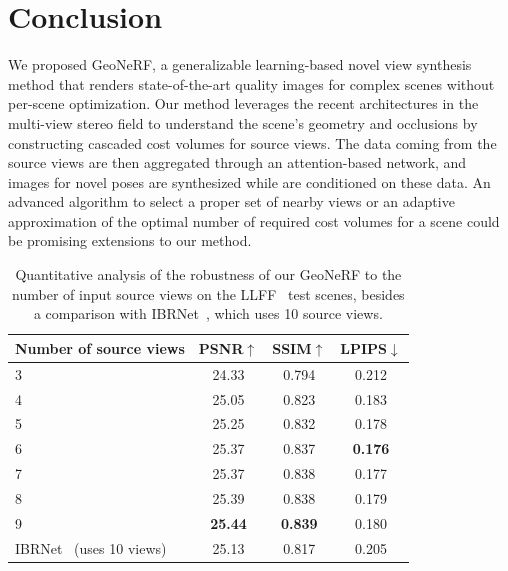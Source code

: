 \section{Conclusion}
We proposed GeoNeRF, a generalizable learning-based novel view synthesis method that renders state-of-the-art quality images for complex scenes without per-scene optimization. Our method leverages the recent architectures in the multi-view stereo field to understand the scene's geometry and occlusions by constructing cascaded cost volumes for source views. The data coming from the source views are then aggregated through an attention-based network, and images for novel poses are synthesized while are conditioned on these data. An advanced algorithm to select a proper set of nearby views or an adaptive approximation of the optimal number of required cost volumes for a scene could be promising extensions to our method.

\begin{table}[!t]
\begin{center}
        \begin{tabular}{l|ccc}
        \hline
        Number of source views & PSNR$\uparrow$ & SSIM$\uparrow$ & LPIPS$\downarrow$  \\
        \hline
        3 & 24.33 & 0.794 & 0.212  \\
        4 & 25.05 & 0.823 & 0.183  \\
        5 & 25.25 & 0.832 & 0.178  \\
        6  & 25.37 & 0.837 & \textbf{0.176} \\
        7 & 25.37 & 0.838 & 0.177  \\
        8 & 25.39 & 0.838 & 0.179  \\
        9 & \textbf{25.44} & \textbf{0.839} & 0.180  \\
        \hline
        IBRNet~\citep{wang2021ibrnet} (uses 10 views) & 25.13 & 0.817 & 0.205  \\
        \hline
        \end{tabular}
    \end{center}
    \caption{Quantitative analysis of the robustness of our GeoNeRF to the number of input source views on the LLFF~\citep{mildenhall2019llff} test scenes, besides a comparison with IBRNet~\citep{wang2021ibrnet}, which uses 10 source views.}
    \label{table:n_views}
\end{table}

